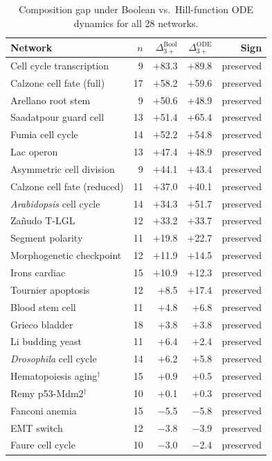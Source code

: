 \documentclass[10pt]{article}
\begin{document}
\begin{table}[h]
\centering
\caption{Composition gap under Boolean vs.\ Hill-function ODE
dynamics for all 28 networks.}
\begin{tabular}{lrrrr}
\toprule
Network & $n$ & $\Delta_{3+}^{\mathrm{Bool}}$ & $\Delta_{3+}^{\mathrm{ODE}}$ & Sign \\
\midrule
Cell cycle transcription & 9 & $+$83.3 & $+$89.8 & preserved \\
Calzone cell fate (full) & 17 & $+$58.2 & $+$59.6 & preserved \\
Arellano root stem & 9 & $+$50.6 & $+$48.9 & preserved \\
Saadatpour guard cell & 13 & $+$51.4 & $+$65.4 & preserved \\
Fumia cell cycle & 14 & $+$52.2 & $+$54.8 & preserved \\
Lac operon & 13 & $+$47.4 & $+$48.9 & preserved \\
Asymmetric cell division & 9 & $+$44.1 & $+$43.4 & preserved \\
Calzone cell fate (reduced) & 11 & $+$37.0 & $+$40.1 & preserved \\
\emph{Arabidopsis} cell cycle & 14 & $+$34.3 & $+$51.7 & preserved \\
Za\~nudo T-LGL & 12 & $+$33.2 & $+$33.7 & preserved \\
Segment polarity & 11 & $+$19.8 & $+$22.7 & preserved \\
Morphogenetic checkpoint & 12 & $+$11.9 & $+$14.5 & preserved \\
Irons cardiac & 15 & $+$10.9 & $+$12.3 & preserved \\
Tournier apoptosis & 12 & $+$8.5 & $+$17.4 & preserved \\
Blood stem cell & 11 & $+$4.8 & $+$6.8 & preserved \\
Grieco bladder & 18 & $+$3.8 & $+$3.8 & preserved \\
Li budding yeast & 11 & $+$6.4 & $+$2.4 & preserved \\
\emph{Drosophila} cell cycle & 14 & $+$6.2 & $+$5.8 & preserved \\
Hematopoiesis aging$^\dagger$ & 15 & $+$0.9 & $+$0.5 & preserved \\
Remy p53-Mdm2$^\dagger$ & 10 & $+$0.1 & $+$0.3 & preserved \\
Fanconi anemia & 15 & $-$5.5 & $-$5.8 & preserved \\
EMT switch & 12 & $-$3.8 & $-$3.9 & preserved \\
Faure cell cycle & 10 & $-$3.0 & $-$2.4 & preserved \\

\end{tabular}
\end{table}
\end{document}
